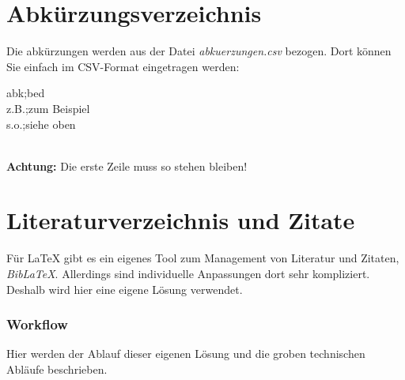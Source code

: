 \documentclass[12pt]{article}
\begin{document}
\part{Abkürzungsverzeichnis}
Die abkürzungen werden aus der Datei \textit{abkuerzungen.csv} bezogen. Dort können Sie einfach im CSV-Format eingetragen werden:\\[6pt]
\colorbox{grayBack}{\begin{minipage}{4cm}
\vspace{5pt}
\hspace{5pt}abk;bed\\
\-\hspace{5pt}z.B.;zum Beispiel\\
\-\hspace{5pt}s.o.;siehe oben\vspace{5pt}
\end{minipage}
}\\[6pt]
\textbf{Achtung:} Die erste Zeile muss so stehen bleiben!

\part{Literaturverzeichnis und Zitate}
Für LaTeX gibt es ein eigenes Tool zum Management von Literatur und Zitaten, \textit{BibLaTeX}. Allerdings sind individuelle Anpassungen dort sehr kompliziert. Deshalb wird hier eine eigene Lösung verwendet.
\section{Workflow}
Hier werden der Ablauf dieser eigenen Lösung und die groben technischen Abläufe beschrieben.
\end{document}
